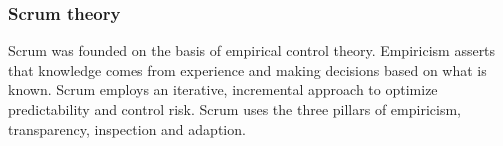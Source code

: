 \subsubsection{Scrum theory}


Scrum was founded on the basis of empirical control theory\cite{scrumguide11}. Empiricism asserts that knowledge comes from experience and making decisions based on what is known\cite{scrumguide11}. Scrum employs an iterative, incremental approach to optimize predictability and control risk\cite{scrumguide11}. Scrum uses the three pillars of empiricism, transparency, inspection and adaption\cite{scrumguide11}.




